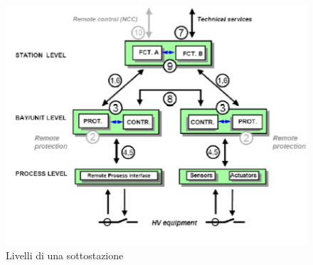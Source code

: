 \begin{figure}[h]%
	\centering
	\includegraphics[scale=0.400]{imgs/61850ls.png}
	\caption{Livelli di una sottostazione} \label{fig:61850ls}
\end{figure}

